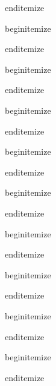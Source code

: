 end{itemize}


begin{itemize}
			\item
			\item
			\item
			\item
			\item

end{itemize}


begin{itemize}
			\item
			\item
			\item
			\item
			\item

end{itemize}


begin{itemize}
			\item
			\item
			\item
			\item
			\item

end{itemize}



begin{itemize}
			\item
			\item
			\item
			\item
			\item

end{itemize}



begin{itemize}
			\item
			\item
			\item
			\item
			\item

end{itemize}


begin{itemize}
			\item
			\item
			\item
			\item
			\item

end{itemize}


begin{itemize}
			\item
			\item
			\item
			\item
			\item

end{itemize}


begin{itemize}
			\item
			\item
			\item
			\item
			\item

end{itemize}


begin{itemize}
			\item
			\item
			\item
			\item
			\item

end{itemize}








